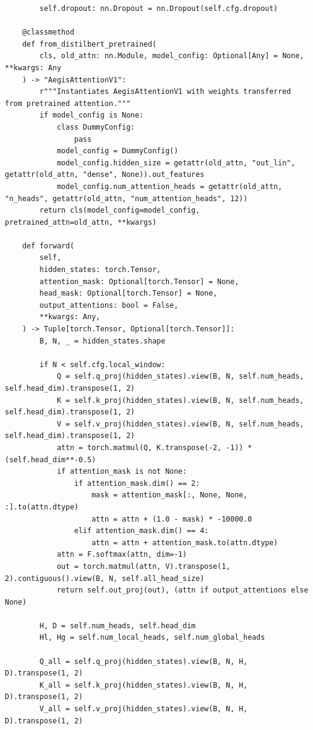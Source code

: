 \begin{lstlisting}
        self.dropout: nn.Dropout = nn.Dropout(self.cfg.dropout)

    @classmethod
    def from_distilbert_pretrained(
        cls, old_attn: nn.Module, model_config: Optional[Any] = None, **kwargs: Any
    ) -> "AegisAttentionV1":
        r"""Instantiates AegisAttentionV1 with weights transferred from pretrained attention."""
        if model_config is None:
            class DummyConfig:
                pass
            model_config = DummyConfig()
            model_config.hidden_size = getattr(old_attn, "out_lin", getattr(old_attn, "dense", None)).out_features
            model_config.num_attention_heads = getattr(old_attn, "n_heads", getattr(old_attn, "num_attention_heads", 12))
        return cls(model_config=model_config, pretrained_attn=old_attn, **kwargs)

    def forward(
        self,
        hidden_states: torch.Tensor,
        attention_mask: Optional[torch.Tensor] = None,
        head_mask: Optional[torch.Tensor] = None,
        output_attentions: bool = False,
        **kwargs: Any,
    ) -> Tuple[torch.Tensor, Optional[torch.Tensor]]:
        B, N, _ = hidden_states.shape

        if N < self.cfg.local_window:
            Q = self.q_proj(hidden_states).view(B, N, self.num_heads, self.head_dim).transpose(1, 2)
            K = self.k_proj(hidden_states).view(B, N, self.num_heads, self.head_dim).transpose(1, 2)
            V = self.v_proj(hidden_states).view(B, N, self.num_heads, self.head_dim).transpose(1, 2)
            attn = torch.matmul(Q, K.transpose(-2, -1)) * (self.head_dim**-0.5)
            if attention_mask is not None:
                if attention_mask.dim() == 2:
                    mask = attention_mask[:, None, None, :].to(attn.dtype)
                    attn = attn + (1.0 - mask) * -10000.0
                elif attention_mask.dim() == 4:
                    attn = attn + attention_mask.to(attn.dtype)
            attn = F.softmax(attn, dim=-1)
            out = torch.matmul(attn, V).transpose(1, 2).contiguous().view(B, N, self.all_head_size)
            return self.out_proj(out), (attn if output_attentions else None)

        H, D = self.num_heads, self.head_dim
        Hl, Hg = self.num_local_heads, self.num_global_heads

        Q_all = self.q_proj(hidden_states).view(B, N, H, D).transpose(1, 2)
        K_all = self.k_proj(hidden_states).view(B, N, H, D).transpose(1, 2)
        V_all = self.v_proj(hidden_states).view(B, N, H, D).transpose(1, 2)


\end{lstlisting}
